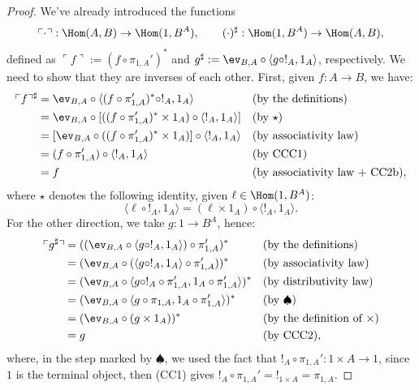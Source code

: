 \begin{proof}
    We've already introduced the functions
    \[ \ulcorner \cdot \urcorner : \Hom(A,B) \to \Hom(1, B^A), \qquad (\cdot)^\sharp : \Hom(1, B^A) \to \Hom(A,B),\]
    defined as $\ulcorner f \urcorner := (f \circ \pi_{1,A}')^*$ and $g^\sharp := \ev_{B,A} \circ \langle g\circ !_A,1_A\rangle$, respectively.
    We need to show that they are inverses of each other. First, given $f : A \to B$, we have:
    \begin{align*}
        \ulcorner f \urcorner^\sharp &= \ev_{B,A} \circ \langle (f \circ \pi_{1,A}')^* \circ !_A, 1_A\rangle &&(\textnormal{by the definitions}) \\
                                     &= \ev_{B,A} \circ [((f \circ \pi_{1,A}')^* \times 1_A) \circ \langle !_A, 1_A\rangle] &&(\textnormal{by $\star$}) \\
                                     &= [\ev_{B,A} \circ ((f \circ \pi_{1,A}')^*\times 1_A)] \circ \langle !_A, 1_A\rangle &&(\textnormal{by associativity law}) \\
                                     &= (f \circ \pi_{1,A}') \circ \langle !_A, 1_A\rangle &&(\textnormal{by CCC1}) \\
                                     &= f &&(\textnormal{by associativity law + CC2b}),
    \end{align*}
    where $\star$ denotes the following identity, given $\ell \in \Hom(1,B^A)$:
    \[ \langle \ell \circ !_A, 1_A\rangle = (\ell \times 1_A) \circ \langle !_A, 1_A\rangle. \]
    For the other direction, we take $g : 1 \to B^A$, hence:
    \begin{align*}
        \ulcorner g^\sharp \urcorner &= ((\ev_{B,A} \circ \langle g\circ !_A,1_A\rangle) \circ \pi_{1,A}')^* &&(\textnormal{by the definitions}) \\
                                     &= (\ev_{B,A} \circ (\langle g\circ !_A, 1_A\rangle \circ \pi_{1,A}'))^* &&(\textnormal{by associativity law}) \\
                                     &= (\ev_{B,A} \circ \langle g\circ !_A \circ \pi_{1,A}', 1_A \circ \pi_{1,A}'\rangle)^* &&(\textnormal{by distributivity law}) \\
                                     &= (\ev_{B,A} \circ \langle g\circ \pi_{1,A}, 1_A \circ \pi_{1,A}'\rangle)^* &&(\textnormal{by $\spadesuit$}) \\
                                     &= (\ev_{B,A} \circ (g \times 1_A))^* &&(\textnormal{by the definition of $\times$}) \\
                                     &= g &&(\textnormal{by CCC2}),
    \end{align*}
    where, in the step marked by $\spadesuit$, we used the fact that $!_A \circ \pi_{1,A}' : 1 \times A \to 1$, since $1$ is the terminal object, then (CC1) gives $!_A \circ \pi_{1,A}' = !_{1 \times A} = \pi_{1,A}$.
\end{proof}

